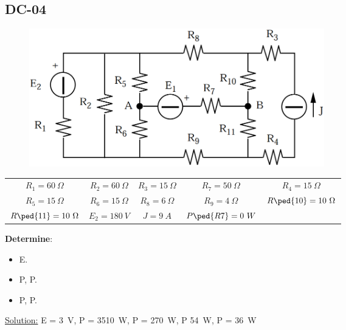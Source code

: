 \subsection{DC-04}
\begin{figure}[h]
\includegraphics[height=6cm]{img/1/04.png}
\centering
\end{figure}
\begin{center}
\begin{tabular}{ c c c c c}
  $R_1 = 60 \ \Omega$ & $R_2 = 60 \ \Omega$ & $R_3 = 15 \ \Omega$ & $R_7 = 50 \ \Omega$ & $R_4 = 15 \ \Omega$\\
  $R_5 = 15\ \Omega$ & $R_6 = 15\ \Omega$ & $R_8 = 6 \ \Omega$& $R_9 = 4 \ \Omega$ & $R\ped{10} = 10 \ \Omega$ \\
  $R\ped{11} = 10 \ \Omega$ & $E_2 = 180 \ V$ & $J = 9 \ A$ & $P\ped{R7} = 0 \ W$ \\
\end{tabular}
\end{center}
\textbf{Determine}:
\begin{itemize}
  \item E.
  \item P, P. 
  \item P, P. 
\end{itemize}
\underline{\large{Solution:}}
\newline
E = 3\ V, P = 3510\ W, P = 270\ W, P 54\ W, P = 36\ W
